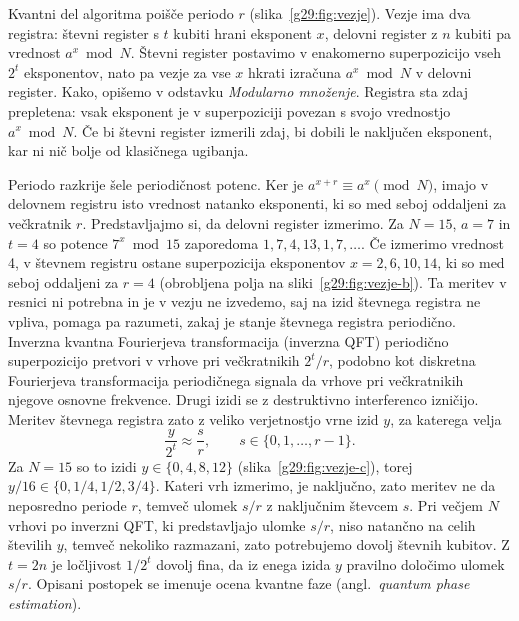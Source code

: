  Kvantni del algoritma poišče periodo $r$ (slika~\ref{g29:fig:vezje}). Vezje ima dva registra: števni register s $t$ kubiti hrani eksponent $x$, delovni register z $n$ kubiti pa vrednost $a^x \bmod N$. Števni register postavimo v enakomerno superpozicijo vseh $2^t$ eksponentov, nato pa vezje za vse $x$ hkrati izračuna $a^x \bmod N$ v delovni register. Kako, opišemo v odstavku \emph{Modularno množenje}. Registra sta zdaj prepletena: vsak eksponent je v superpoziciji povezan s svojo vrednostjo $a^x \bmod N$. Če bi števni register izmerili zdaj, bi dobili le naključen eksponent, kar ni nič bolje od klasičnega ugibanja.

Periodo razkrije šele periodičnost potenc. Ker je $a^{x+r} \equiv a^x \pmod N$, imajo v delovnem registru isto vrednost natanko eksponenti, ki so med seboj oddaljeni za večkratnik $r$. Predstavljajmo si, da delovni register izmerimo. Za $N = 15$, $a = 7$ in $t = 4$ so potence $7^x \bmod 15$ zaporedoma $1, 7, 4, 13, 1, 7, \dots$. Če izmerimo vrednost 4, v števnem registru ostane superpozicija eksponentov $x = 2, 6, 10, 14$, ki so med seboj oddaljeni za $r = 4$ (obrobljena polja na sliki~\ref{g29:fig:vezje-b}). Ta meritev v resnici ni potrebna in je v vezju ne izvedemo, saj na izid števnega registra ne vpliva, pomaga pa razumeti, zakaj je stanje števnega registra periodično. Inverzna kvantna Fourierjeva transformacija (inverzna QFT) periodično superpozicijo pretvori v vrhove pri večkratnikih $2^t/r$, podobno kot diskretna Fourierjeva transformacija periodičnega signala da vrhove pri večkratnikih njegove osnovne frekvence. Drugi izidi se z destruktivno interferenco izničijo. Meritev števnega registra zato z veliko verjetnostjo vrne izid $y$, za katerega velja
\begin{equation}
\frac{y}{2^t} \approx \frac{s}{r}, \qquad s \in \{0, 1, \dots, r-1\}.
\label{g29:eq:faza}
\end{equation}
Za $N = 15$ so to izidi $y \in \{0, 4, 8, 12\}$ (slika~\ref{g29:fig:vezje-c}), torej $y/16 \in \{0, 1/4, 1/2, 3/4\}$. Kateri vrh izmerimo, je naključno, zato meritev ne da neposredno periode $r$, temveč ulomek $s/r$ z naključnim števcem $s$. Pri večjem $N$ vrhovi po inverzni QFT, ki predstavljajo ulomke $s/r$, niso natančno na celih številih $y$, temveč nekoliko razmazani, zato potrebujemo dovolj števnih kubitov. Z $t = 2n$ je ločljivost $1/2^t$ dovolj fina, da iz enega izida $y$ pravilno določimo ulomek $s/r$. Opisani postopek se imenuje ocena kvantne faze (angl.\ \emph{quantum phase estimation}).

